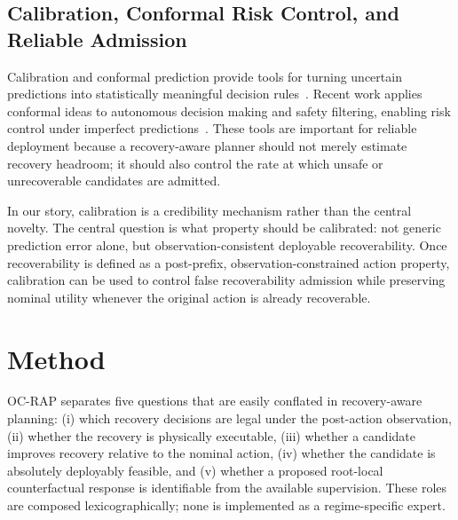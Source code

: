 \documentclass[conference]{IEEEtran}
\begin{document}
\subsection{Calibration, Conformal Risk Control, and Reliable Admission}

Calibration and conformal prediction provide tools for turning uncertain predictions into statistically meaningful decision rules~\cite{vovk2005algorithmic,stephen2021gentle,angelopoulos2024conformal}.  Recent work applies conformal ideas to autonomous decision making and safety filtering, enabling risk control under imperfect predictions~\cite{lekeufack2024conformal,strawn2023conformal}.  These tools are important for reliable deployment because a recovery-aware planner should not merely estimate recovery headroom; it should also control the rate at which unsafe or unrecoverable candidates are admitted.

In our story, calibration is a credibility mechanism rather than the central novelty.  The central question is what property should be calibrated: not generic prediction error alone, but observation-consistent deployable recoverability.  Once recoverability is defined as a post-prefix, observation-constrained action property, calibration can be used to control false recoverability admission while preserving nominal utility whenever the original action is already recoverable.









\section{Method}
\label{sec:method}

OC-RAP separates five questions that are easily conflated in recovery-aware planning: (i) which recovery decisions are legal under the post-action observation, (ii) whether the recovery is physically executable, (iii) whether a candidate improves recovery relative to the nominal action, (iv) whether the candidate is absolutely deployably feasible, and (v) whether a proposed root-local counterfactual response is identifiable from the available supervision. These roles are composed lexicographically; none is implemented as a regime-specific expert.
\end{document}
